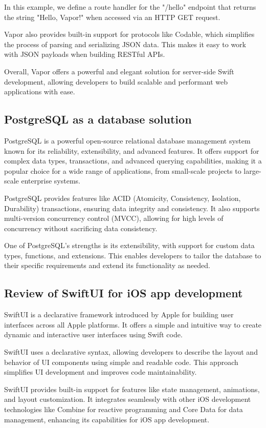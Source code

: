 \documentclass[
  biblatex,
  language=english,
  figures=false,
  sourcecodes,
  glossaries,
  index
]{kidiplom}
\begin{document}
In this example, we define a route handler for the "/hello" endpoint that returns the string "Hello, Vapor!" when accessed via an HTTP GET request.

Vapor also provides built-in support for protocols like Codable, which simplifies the process of parsing and serializing JSON data. This makes it easy to work with JSON payloads when building RESTful APIs.

Overall, Vapor offers a powerful and elegant solution for server-side Swift development, allowing developers to build scalable and performant web applications with ease.

\subsection{PostgreSQL as a database solution}
PostgreSQL is a powerful open-source relational database management system known for its reliability, extensibility, and advanced features. It offers support for complex data types, transactions, and advanced querying capabilities, making it a popular choice for a wide range of applications, from small-scale projects to large-scale enterprise systems.

PostgreSQL provides features like ACID (Atomicity, Consistency, Isolation, Durability) transactions, ensuring data integrity and consistency. It also supports multi-version concurrency control (MVCC), allowing for high levels of concurrency without sacrificing data consistency.

One of PostgreSQL's strengths is its extensibility, with support for custom data types, functions, and extensions. This enables developers to tailor the database to their specific requirements and extend its functionality as needed.

\subsection{Review of SwiftUI for iOS app development}
SwiftUI is a declarative framework introduced by Apple for building user interfaces across all Apple platforms. It offers a simple and intuitive way to create dynamic and interactive user interfaces using Swift code.

SwiftUI uses a declarative syntax, allowing developers to describe the layout and behavior of UI components using simple and readable code. This approach simplifies UI development and improves code maintainability.

SwiftUI provides built-in support for features like state management, animations, and layout customization. It integrates seamlessly with other iOS development technologies like Combine for reactive programming and Core Data for data management, enhancing its capabilities for iOS app development.
\end{document}
